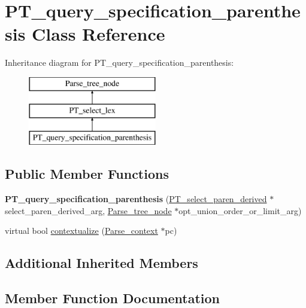 \hypertarget{classPT__query__specification__parenthesis}{}\section{P\+T\+\_\+query\+\_\+specification\+\_\+parenthesis Class Reference}
\label{classPT__query__specification__parenthesis}
Inheritance diagram for P\+T\+\_\+query\+\_\+specification\+\_\+parenthesis\+:\begin{figure}[H]
\begin{center}
\leavevmode
\includegraphics[height=3.000000cm]{classPT__query__specification__parenthesis}
\end{center}
\end{figure}
\subsection*{Public Member Functions}
\begin{DoxyCompactItemize}
\item 
\mbox{\label{classPT__query__specification__parenthesis_a9ee5433955887f1793ce8c05fedbfe45}} 
{\bfseries P\+T\+\_\+query\+\_\+specification\+\_\+parenthesis} (\mbox{\hyperlink{classPT__select__paren__derived}{P\+T\+\_\+select\+\_\+paren\+\_\+derived}} $\ast$select\+\_\+paren\+\_\+derived\+\_\+arg, \mbox{\hyperlink{classParse__tree__node}{Parse\+\_\+tree\+\_\+node}} $\ast$opt\+\_\+union\+\_\+order\+\_\+or\+\_\+limit\+\_\+arg)
\item 
virtual bool \mbox{\hyperlink{classPT__query__specification__parenthesis_af375d7399dd0886ee4c59bc9e929a661}{contextualize}} (\mbox{\hyperlink{structParse__context}{Parse\+\_\+context}} $\ast$pc)
\end{DoxyCompactItemize}
\subsection*{Additional Inherited Members}


\subsection{Member Function Documentation}
\mbox{\label{classPT__query__specification__parenthesis_af375d7399dd0886ee4c59bc9e929a661}} 

